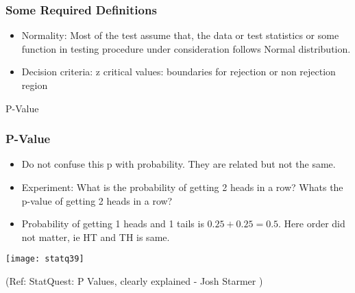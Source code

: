 \begin{frame}[fragile]\frametitle{Some Required Definitions}
\begin{itemize}
\item Normality: Most of the test assume that, the data or test statistics 
or some function in testing procedure under consideration follows 
Normal distribution. 
 
\item Decision  criteria: z critical values:  boundaries for rejection or non rejection region
\end{itemize}
\end{frame}

\begin{frame}
\begin{center}
{\Large P-Value}
\end{center}
\end{frame}



\begin{frame}[fragile]\frametitle{P-Value}


	\begin{itemize}

	\item Do not confuse this p with probability. They are related but not the same.
	\item Experiment: What is the probability of getting 2 heads in a row? Whats the p-value of getting 2 heads in a row?
	\item Probability of getting 1 heads and 1 tails is $0.25 + 0.25 = 0.5$. Here order did not matter, ie HT and TH is same.
	
	\end{itemize}


      \begin{center}
      \texttt{[image: statq39]}
	  	\end{center}

  
 
\tiny{(Ref: StatQuest: P Values, clearly explained - Josh Starmer )}
\end{frame}

